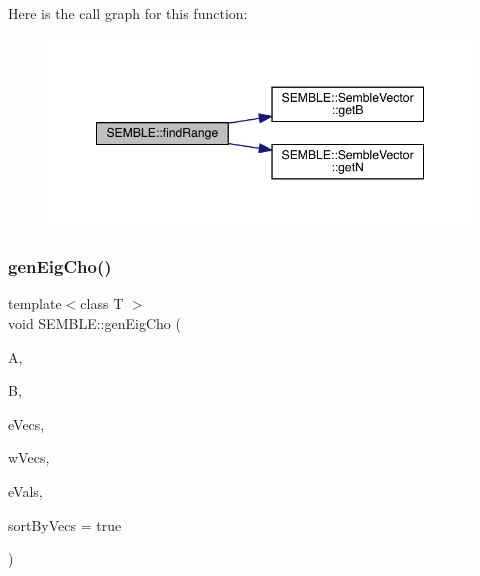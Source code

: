 Here is the call graph for this function\+:
\nopagebreak
\begin{figure}[H]
\begin{center}
\leavevmode
\includegraphics[width=348pt]{d7/dfd/namespaceSEMBLE_a2b44000f5384f9856e4274280a6ec702_cgraph}
\end{center}
\end{figure}
\mbox{\label{namespaceSEMBLE_aba06a63f86012e882f63b598d22868af}} 
\subsubsection{\texorpdfstring{genEigCho()}{genEigCho()}}
{\footnotesize\ttfamily template$<$class T $>$ \\
void S\+E\+M\+B\+L\+E\+::gen\+Eig\+Cho (\begin{DoxyParamCaption}\item[{const \mbox{\hyperlink{structSEMBLE_1_1SembleMatrix}{Semble\+Matrix}}$<$ T $>$ \&}]{A,  }\item[{const \mbox{\hyperlink{structSEMBLE_1_1SembleMatrix}{Semble\+Matrix}}$<$ T $>$ \&}]{B,  }\item[{\mbox{\hyperlink{structSEMBLE_1_1SembleMatrix}{Semble\+Matrix}}$<$ T $>$ \&}]{e\+Vecs,  }\item[{\mbox{\hyperlink{structSEMBLE_1_1SembleMatrix}{Semble\+Matrix}}$<$ T $>$ \&}]{w\+Vecs,  }\item[{\mbox{\hyperlink{structSEMBLE_1_1SembleVector}{Semble\+Vector}}$<$ double $>$ \&}]{e\+Vals,  }\item[{const bool}]{sort\+By\+Vecs = {\ttfamily true} }\end{DoxyParamCaption})}

